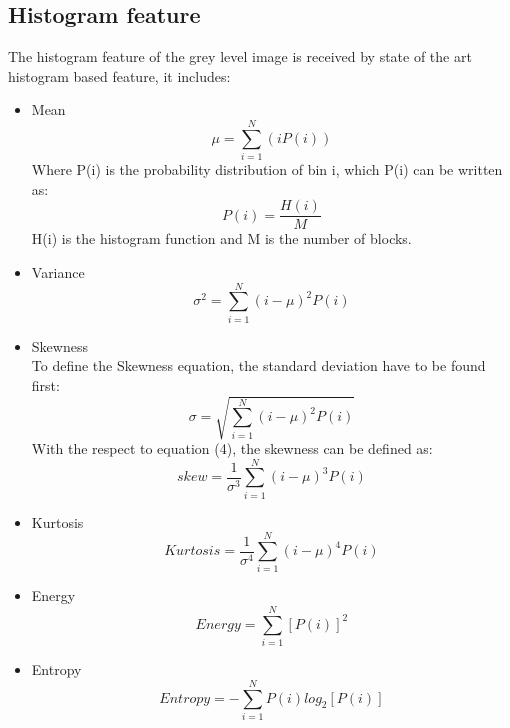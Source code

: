 \documentclass[review]{elsarticle}
\begin{document}
\subsection{Histogram feature}
\label{subsec:histogram}
The histogram feature of the grey level image is received by state of the art histogram based feature, it includes:

\begin{itemize}
	\item Mean
	\begin{equation}
	\mu= \sum_{i=1}^N (iP(i))
	\end{equation}
	Where	P(i) is the probability distribution of bin i, which P(i) can be written as: 
	\begin{equation}
	P(i) =\dfrac{H(i)}{M}
	\end{equation}
	\hspace{1cm}H(i) is the histogram function and M is the number of blocks.
	
	
	\item Variance
	\begin{equation}
	\sigma^2= \sum_{i=1}^N (i - \mu)^2P(i)
	\end{equation}
	
	
	\item Skewness \\
	To define the Skewness equation, the standard deviation have to be found first: 
	\begin{equation}
	\sigma = \sqrt{ \sum_{i=1}^N (i - \mu)^2 P(i)}
	\end{equation}
	With the respect to equation (4), the skewness can be defined as: 
	\begin{equation}
	skew = \dfrac{1}{\sigma^3} \sum_{i=1}^N (i - \mu)^3 P(i)
	\end{equation}
	
	\item Kurtosis 
	\begin{equation}
	Kurtosis = \dfrac{1}{\sigma^4} \sum_{i=1}^N (i - \mu)^4 P(i)
	\end{equation}
	
	\item Energy 
	\begin{equation}
	Energy= \sum_{i=1}^N [P(i)]^2
	\end{equation}
	
	
	\item Entropy 
	\begin{equation}
	Entropy= - \sum_{i=1}^N P(i) log_2 [P(i)]
	\end{equation}
\end{itemize}
\end{document}
